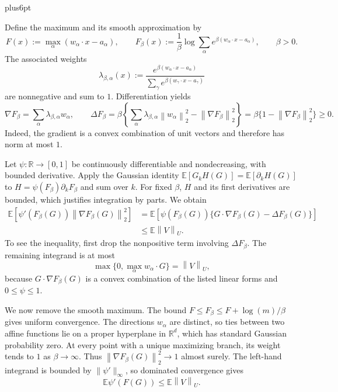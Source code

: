 \documentclass[11pt,letterpaper,twoside,leqno]{article}
\makeatletter
\theoremstyle{bookplain}
\theoremstyle{bookremark}
\renewenvironment{proof}[1][\proofname]{\par
  \pushQED{\qed}\normalfont\topsep6pt plus6pt\relax
  \trivlist\item[\hskip\labelsep\bfseries #1\@addpunct{.}]\ignorespaces
}{\popQED\endtrivlist\@endpefalse}
\newcommand{\E}{\mathbb E}
\newcommand{\R}{\mathbb R}
\newcommand{\norm}[1]{\left\lVert#1\right\rVert}
\makeatother
\begin{document}
\begin{proof}[Proof of Lemma~\ref{lem:concentration}]
Define the maximum and its smooth approximation by
\[
 F(x):=\max_\alpha(w_\alpha\cdot x-a_\alpha),\qquad
 F_\beta(x):=\frac1\beta\log\sum_\alpha
          e^{\beta(w_\alpha\cdot x-a_\alpha)},\qquad\beta>0.
\]
The associated weights
\[
 \lambda_{\beta,\alpha}(x):=
 \frac{e^{\beta(w_\alpha\cdot x-a_\alpha)}}
      {\sum_\gamma e^{\beta(w_\gamma\cdot x-a_\gamma)}}
\]
are nonnegative and sum to $1$. Differentiation yields
\[
 \nabla F_\beta=\sum_\alpha\lambda_{\beta,\alpha}w_\alpha,
 \qquad
 \Delta F_\beta
 =\beta\left\{\sum_\alpha\lambda_{\beta,\alpha}
                       \norm{w_\alpha}_2^2
                     -\norm{\nabla F_\beta}_2^2\right\}
 =\beta\{1-\norm{\nabla F_\beta}_2^2\}\ge0.
\]
Indeed, the gradient is a convex combination of unit vectors and
therefore has norm at most $1$.

Let $\psi:\R\to[0,1]$ be continuously differentiable and
nondecreasing, with bounded derivative. Apply the Gaussian identity
$\E[G_kH(G)]=\E[\partial_kH(G)]$ to
$H=\psi(F_\beta)\partial_kF_\beta$ and sum over $k$.
For fixed $\beta$, $H$ and its first derivatives are bounded,
which justifies integration by parts. We obtain
\[
 \begin{aligned}
 \E[\psi'(F_\beta(G))\norm{\nabla F_\beta(G)}_2^2]
 &=\E[\psi(F_\beta(G))
       \{G\cdot\nabla F_\beta(G)-\Delta F_\beta(G)\}]\\
 &\le\E\norm V_U.
 \end{aligned}
\]
To see the inequality, first drop the nonpositive term involving
$\Delta F_\beta$. The remaining integrand is at most
\[
 \max\{0,\max_\alpha w_\alpha\cdot G\}=\norm V_U,
\]
because $G\cdot\nabla F_\beta(G)$ is a convex combination of the
listed linear forms and $0\le\psi\le1$.

We now remove the smooth maximum. The bound
$F\le F_\beta\le F+\log(m)/\beta$ gives uniform convergence.
The directions $w_\alpha$ are distinct, so ties between two affine
functions lie on a proper hyperplane in $\R^d$, which has standard
Gaussian probability zero. At every point with a unique maximizing
branch, its weight tends to $1$ as $\beta\to\infty$.
Thus $\norm{\nabla F_\beta(G)}_2^2\to1$ almost surely.
The left-hand integrand is bounded by $\|\psi'\|_\infty$,
so dominated convergence gives
\[
 \E\psi'(F(G))\le\E\norm V_U.
\]


\end{proof}
\end{document}
